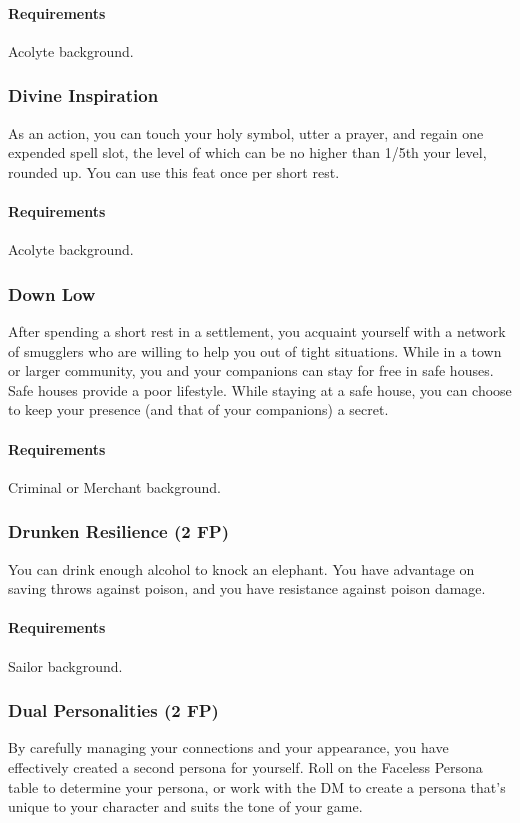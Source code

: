     \paragraph{Requirements} Acolyte background.
\subsubsection{Divine Inspiration} \label{feat::divineinspiration}
    As an action, you can touch your holy symbol, utter a prayer, and regain one expended spell slot, the level of which can be no higher than 1/5th your level, rounded up.
    You can use this feat once per short rest.
    \paragraph{Requirements} Acolyte background.
\subsubsection{Down Low} \label{feat::downlow}
    After spending a short rest in a settlement, you acquaint yourself with a network of smugglers who are willing to help you out of tight situations.
    While in a town or larger community, you and your companions can stay for free in safe houses.
    Safe houses provide a poor lifestyle.
    While staying at a safe house, you can choose to keep your presence (and that of your companions) a secret.
    \paragraph{Requirements} Criminal or Merchant background.
\subsubsection{Drunken Resilience (2 FP)} \label{feat::drunkenresilience}
    You can drink enough alcohol to knock an elephant.
    You have advantage on saving throws against poison, and you have resistance against poison damage.
    \paragraph{Requirements} Sailor background.
\subsubsection{Dual Personalities (2 FP)} \label{feat::dualpersonalities}
    By carefully managing your connections and your appearance, you have effectively created a second persona for yourself.
    Roll on the Faceless Persona table to determine your persona, or work with the DM to create a persona that's unique to your character and suits the tone of your game.

